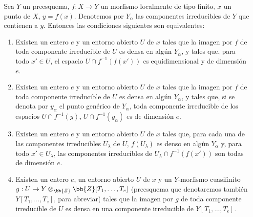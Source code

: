 \begin{proposition}[13.3.1]
\label{IV.13.3.1}
Sea $Y$ un preesquema, $f:X\to Y$ un morfismo localmente de tipo finito, $x$ un punto de $X$, $y=f(x)$.
Denotemos por $Y_\alpha$ las componentes irreducibles de $Y$ que contienen a $y$.
Entonces las condiciones siguientes son equivalentes:
\begin{enumerate}[label=\emph{\alph*)}]
  \item Existen un entero $e$ y un entorno abierto $U$ de $x$ tales que la imagen por $f$ de toda componente irreducible de $U$ es densa en algún $Y_\alpha$, y tales que, para todo $x'\in U$, el espacio $U\cap f^{-1}(f(x'))$ es equidimensional y de dimensión $e$.
  \item[\emph{a$'$)}] Existen un entero $e$ y un entorno abierto $U$ de $x$ tales que la imagen por $f$ de toda componente irreducible de $U$ es densa en algún $Y_\alpha$, y tales que, si se denota por $y_\alpha$ el punto genérico de $Y_\alpha$, toda componente irreducible de los espacios $U\cap f^{-1}(y)$, $U\cap f^{-1}(y_\alpha)$ es de dimensión $e$.
  \item[\emph{a$''$)}] Existen un entero $e$ y un entorno abierto $U$ de $x$ tales que, para cada una de las componentes irreducibles $U_\lambda$ de $U$, $f(U_\lambda)$ es denso en algún $Y_\alpha$ y, para todo $x'\in U_\lambda$, las componentes irreducibles de $U_\lambda\cap f^{-1}(f(x'))$ son todas de dimensión $e$.
  \item Existen un entero $e$, un entorno abierto $U$ de $x$ y un $Y$-morfismo cuasifinito $g:U\to Y\otimes_{\bb{Z}}\bb{Z}[T_1,\ldots,T_e]$ (preesquema que denotaremos también $Y[T_1,\ldots,T_e]$, para abreviar) tales que la imagen por $g$ de toda componente irreducible de $U$ es densa en una componente irreducible de $Y[T_1,\ldots,T_e]$.
\end{enumerate}
\end{proposition}

